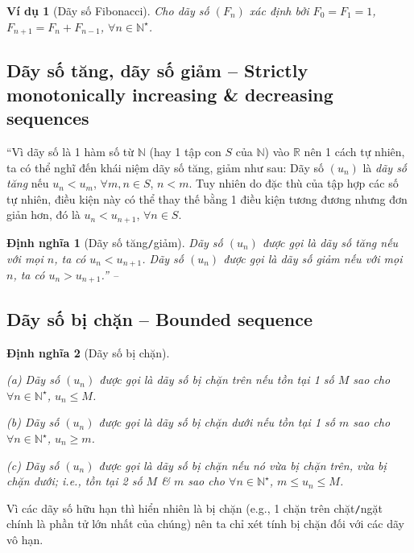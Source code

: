 \documentclass[oneside]{book}
\numberwithin{equation}{section}
\newtheorem{dinhnghia}{Định nghĩa}[section]
\newtheorem{vidu}{Ví dụ}[section]
\begin{document}
\begin{vidu}[Dãy số Fibonacci]
	Cho dãy số $(F_n)$ xác định bởi $F_0 = F_1 = 1$, $F_{n+1} = F_n + F_{n-1}$, $\forall n\in\mathbb{N}^\star$.
\end{vidu}

\subsection{Dãy số tăng, dãy số giảm -- Strictly monotonically increasing \& decreasing sequences}
``Vì dãy số là 1 hàm số từ $\mathbb{N}$ (hay 1 tập con $S$ của $\mathbb{N}$) vào $\mathbb{R}$ nên 1 cách tự nhiên, ta có thể nghĩ đến khái niệm dãy số tăng, giảm như sau: Dãy số $(u_n)$ là \textit{dãy số tăng} nếu $u_n < u_m$, $\forall m,n\in S$, $n < m$. Tuy nhiên do đặc thù của tập hợp các số tự nhiên, điều kiện này có thể thay thế bằng 1 điều kiện tương đương nhưng đơn giản hơn, đó là $u_n < u_{n+1}$, $\forall n\in S$.

\begin{dinhnghia}[Dãy số tăng\texttt{/}giảm]
	Dãy số $(u_n)$ được gọi là \emph{dãy số tăng} nếu với mọi $n$, ta có $u_n < u_{n+1}$. Dãy số $(u_n)$ được gọi là \emph{dãy số giảm} nếu với mọi $n$, ta có $u_n > u_{n+1}$.'' -- \cite[p. 119]{TL_chuyen_Toan_Dai_So_Giai_Tich_11}
\end{dinhnghia}

\subsection{Dãy số bị chặn -- Bounded sequence}

\begin{dinhnghia}[Dãy số bị chặn]
	\begin{enumerate*}
		\item[(a)] Dãy số $(u_n)$ được gọi là \emph{dãy số bị chặn trên} nếu tồn tại 1 số $M$ sao cho $\forall n\in\mathbb{N}^\star$, $u_n\le M$.
		\item[(b)] Dãy số $(u_n)$ được gọi là \emph{dãy số bị chặn dưới} nếu tồn tại 1 số $m$ sao cho $\forall n\in\mathbb{N}^\star$, $u_n\ge m$.
		\item[(c)] Dãy số $(u_n)$ được gọi là \emph{dãy số bị chặn} nếu nó vừa bị chặn trên, vừa bị chặn dưới; i.e., tồn tại 2 số $M$ \& $m$ sao cho $\forall n\in\mathbb{N}^\star$, $m\le u_n\le M$.
	\end{enumerate*}
\end{dinhnghia}
Vì các dãy số hữu hạn thì hiển nhiên là bị chặn (e.g., 1 chặn trên chặt\texttt{/}ngặt chính là phần tử lớn nhất của chúng) nên ta chỉ xét tính bị chặn đối với các dãy vô hạn.
\end{document}
